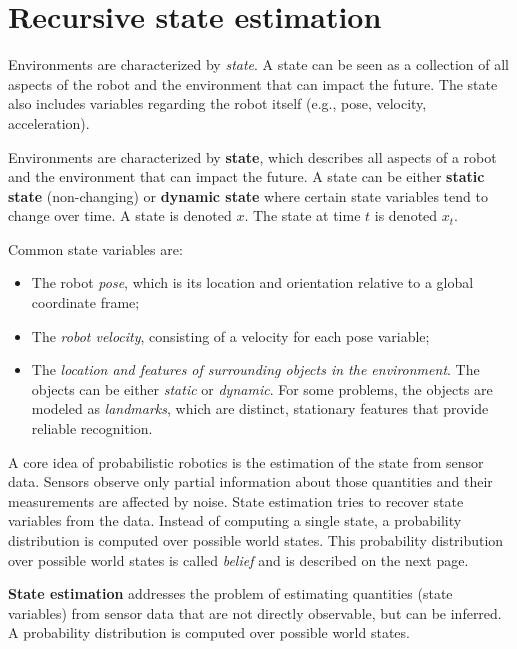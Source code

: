 \section{Recursive state estimation}
\label{sec:background-recursive-state-estimation}
Environments are characterized by \textit{state}.
A state can be seen as a collection of all aspects of the robot and the environment that can impact the future.
The state also includes variables regarding the robot itself (e.g., pose, velocity, acceleration).
\begin{mydef}
Environments are characterized by \textbf{state}, which describes all aspects of a robot and the environment that can impact the future.
A state can be either \textbf{static state} (non-changing) or \textbf{dynamic state} where certain state variables tend to change over time.
A state is denoted $x$.
The state at time $t$ is denoted $x_t$.
\end{mydef}
Common state variables are:
\begin{itemize}
\item The robot \textit{pose}, which is its location and orientation relative to a global coordinate frame;
\item The \textit{robot velocity}, consisting of a velocity for each pose variable; %
\item The \textit{location and features of surrounding objects in the environment}. The objects can be either \textit{static} or \textit{dynamic}. For some problems, the objects are modeled as \textit{landmarks}, which are distinct, stationary features that provide reliable recognition.
\end{itemize}

A core idea of probabilistic robotics is the estimation of the state from sensor data.
Sensors observe only partial information about those quantities and their measurements are affected by noise. 
State estimation tries to recover state variables from the data.
Instead of computing a single state, a probability distribution is computed over possible world states.
This probability distribution over possible world states is called \textit{belief} and is described on the next page.
\begin{mydef}
\textbf{State estimation} addresses the problem of estimating quantities (state variables) from sensor data that are not directly observable, but can be inferred.
A probability distribution is computed over possible world states.
\end{mydef}

